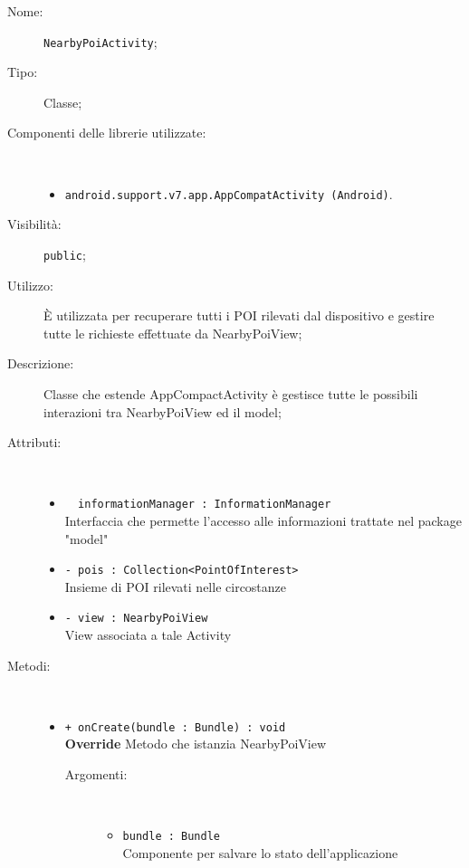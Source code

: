 \documentclass[../DefinizioneDiProdotto.tex]{subfiles}
\begin{document}
\begin{description}
	\item[Nome:] \texttt{NearbyPoiActivity};
	\item[Tipo:] Classe;
	\item[Componenti delle librerie utilizzate:] \
	\begin{itemize}
		\item \texttt{android.support.v7.app.AppCompatActivity (Android)}.
		
	\end{itemize}
	\item[Visibilità:] \texttt{public};
	\item[Utilizzo:] È utilizzata per recuperare tutti i POI rilevati dal dispositivo e gestire tutte le richieste effettuate da NearbyPoiView;
	\item[Descrizione:] Classe che estende AppCompactActivity è gestisce tutte le possibili interazioni tra NearbyPoiView ed il model;
	\item[Attributi:] \
	\begin{itemize}
		\item \texttt{~ informationManager : InformationManager}\\
		Interfaccia che permette l'accesso alle informazioni trattate nel package "model"
		
		\item \texttt{- pois : Collection<PointOfInterest>}\\
		Insieme di POI rilevati nelle circostanze
		
		\item \texttt{- view : NearbyPoiView}\\
		View associata a tale Activity
		
	\end{itemize}
	\item[Metodi:] \
	\begin{itemize}
		\item \texttt{+ onCreate(bundle : Bundle) : void}\\
		\textbf{Override} Metodo che istanzia NearbyPoiView
		\begin{description}
			\item[Argomenti:] \
			\begin{itemize}
				\item \texttt{bundle : Bundle}\\
				Componente per salvare lo stato dell'applicazione\end{itemize}
		\end{description}
	\end{itemize}
\end{description}
\end{document}
